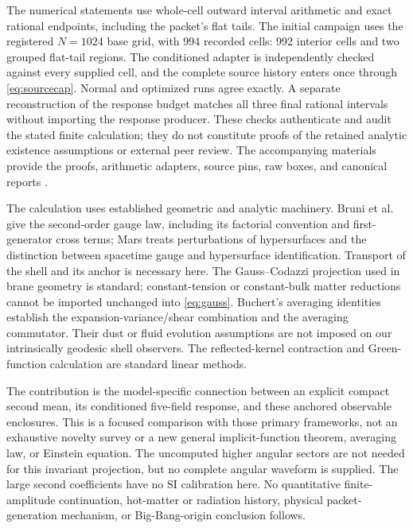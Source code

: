 \documentclass[11pt]{article}
\begin{document}
The numerical statements use whole-cell outward interval arithmetic and
exact rational endpoints, including the packet's flat tails. The initial
campaign uses the registered $N=1024$ base grid, with 994 recorded cells:
992 interior cells and two grouped flat-tail regions. The conditioned adapter is
independently checked against every supplied cell, and the complete source
history enters once through \eqref{eq:sourcecap}. Normal and optimized
runs agree exactly. A separate reconstruction of the response budget
matches all three final rational intervals without importing the response
producer. These checks authenticate and audit the stated finite
calculation; they do not constitute proofs of the retained analytic
existence assumptions or external peer review. The accompanying materials
provide the proofs, arithmetic adapters, source pins, raw boxes, and
canonical reports \cite{companion}.

The calculation uses established geometric and analytic machinery.
Bruni et al.\ \cite{Bruni} give the second-order gauge law, including
its factorial convention and first-generator cross terms; Mars
\cite{Mars} treats perturbations of hypersurfaces and the distinction
between spacetime gauge and hypersurface identification. Transport of the
shell and its anchor is necessary here. The Gauss--Codazzi projection
used in brane geometry \cite{SMS} is standard; constant-tension or
constant-bulk matter reductions cannot be imported unchanged into
\eqref{eq:gauss}. Buchert's averaging identities \cite{BuchertI,BuchertII}
establish the expansion-variance/shear combination and the averaging
commutator. Their dust or fluid evolution assumptions are not imposed on
our intrinsically geodesic shell observers. The reflected-kernel
contraction and Green-function calculation are standard linear methods.

The contribution is the model-specific connection between an explicit
compact second mean, its conditioned five-field response, and these
anchored observable enclosures. This is a focused comparison with those
primary frameworks, not an exhaustive novelty survey or a new general
implicit-function theorem, averaging law, or Einstein equation. The
uncomputed higher angular sectors are not needed for this invariant
projection, but no complete angular waveform is supplied. The large
second coefficients have no SI calibration here. No quantitative
finite-amplitude continuation, hot-matter or radiation history, physical
packet-generation mechanism, or Big-Bang-origin conclusion follows.
\end{document}
